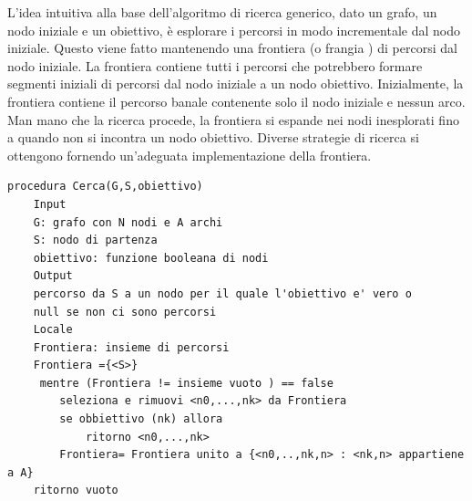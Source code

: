 \documentclass[a4paper]{extarticle}
\begin{document}
L'idea intuitiva alla base dell'algoritmo di ricerca generico, dato un grafo, un nodo iniziale e un obiettivo, è esplorare i percorsi in modo incrementale dal nodo iniziale. Questo viene fatto mantenendo una frontiera (o frangia ) di percorsi dal nodo iniziale. La frontiera contiene tutti i percorsi che potrebbero formare segmenti iniziali di percorsi dal nodo iniziale a un nodo obiettivo.  Inizialmente, la frontiera contiene il percorso banale contenente solo il nodo iniziale e nessun arco. Man mano che la ricerca procede, la frontiera si espande nei nodi inesplorati fino a quando non si incontra un nodo obiettivo. Diverse strategie di ricerca si ottengono fornendo un'adeguata implementazione della frontiera.
\begin{lstlisting}
procedura Cerca(G,S,obiettivo)
	Input
	G: grafo con N nodi e A archi
	S: nodo di partenza
	obiettivo: funzione booleana di nodi
	Output
	percorso da S a un nodo per il quale l'obiettivo e' vero o
	null se non ci sono percorsi 
	Locale
	Frontiera: insieme di percorsi
	Frontiera ={<S>}
	 mentre (Frontiera != insieme vuoto ) == false
	 	seleziona e rimuovi <n0,...,nk> da Frontiera
	 	se obbiettivo (nk) allora
	 		ritorno <n0,...,nk>
	 	Frontiera= Frontiera unito a {<n0,..,nk,n> : <nk,n> appartiene a A}
	ritorno vuoto
\end{lstlisting}
\end{document}
